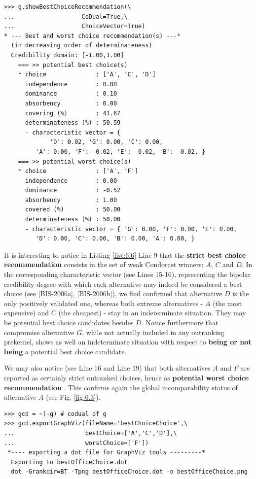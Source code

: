 \begin{lstlisting}[caption={Computing the strict best choice recommendation},label=list:6.6]
>>> g.showBestChoiceRecommendation(\
...                   CoDual=True,\
...                   ChoiceVector=True)   
* --- Best and worst choice recommendation(s) ---*
  (in decreasing order of determinateness)   
  Credibility domain: [-1.00,1.00]
    === >> potential best choice(s)
    * choice              : ['A', 'C', 'D']
      independence        : 0.00
      dominance           : 0.10
      absorbency          : 0.00
      covering (%)        : 41.67
      determinateness (%) : 50.59
      - characteristic vector = {
             'D': 0.02, 'G': 0.00, 'C': 0.00,
	     'A': 0.00, 'F': -0.02, 'E': -0.02, 'B': -0.02, }
    === >> potential worst choice(s) 
    * choice              : ['A', 'F']
      independence        : 0.00
      dominance           : -0.52
      absorbency          : 1.00
      covered (%)         : 50.00
      determinateness (%) : 50.00
      - characteristic vector = { 'G': 0.00, 'F': 0.00, 'E': 0.00,
	     'D': 0.00, 'C': 0.00, 'B': 0.00, 'A': 0.00, }
\end{lstlisting}				  

It is interesting to notice in Listing \ref{list:6.6} Line 9 that the \textbf{strict best choice recommendation} consists in the set of weak Condorcet winners: $A$, $C$ and $D$. In the corresponding characteristic vector (see Lines 15-16), representing the bipolar credibility degree with which each alternative may indeed be considered a best choice (see [BIS-2006a], [BIS-2006b]), we find confirmed that alternative $D$ is the only positively validated one, whereas both extreme alternatives - $A$ (the most expensive) and $C$ (the cheapest) - stay in an indeterminate situation. They may be potential best choice candidates besides $D$. Notice furthermore that compromise alternative $G$, while not actually included in any outranking prekernel, shows as well an indeterminate situation with respect to \textbf{being or not being} a potential best choice candidate. 

We may also notice (see Line 16 and Line 19) that both alternatives $A$ and $F$ are reported as certainly strict outranked choices, hence as \textbf{potential worst choice recommendation} . This confirms again the global incomparability status of alternative $A$ (see Fig. \ref{fig:6.3}).

\begin{lstlisting}
>>> gcd = ~(-g) # codual of g
>>> gcd.exportGraphViz(fileName='bestChoiceChoice',\
...                    bestChoice=['A','C','D'],\
...                    worstChoice=['F'])
 *---- exporting a dot file for GraphViz tools ---------*
  Exporting to bestOfficeChoice.dot
  dot -Grankdir=BT -Tpng bestOfficeChoice.dot -o bestOfficeChoice.png
\end{lstlisting}

